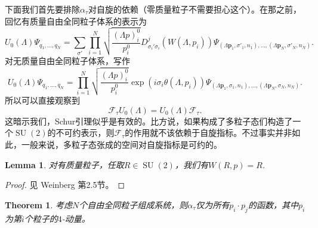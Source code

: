 \documentclass[11pt]{article}
\theoremstyle{definition}
\theoremstyle{plain}
\newtheorem{thm}[para]{Theorem}
\newtheorem{lem}[para]{Lemma}
\begin{document}
下面我们首先要排除$\alpha_\tau$对自旋的依赖（零质量粒子不需要担心这个）。在那之前，回忆有质量自由全同粒子体系的表示为
\[
	U_0(\Lambda)\Psi_{q_1,\dots,q_N}=\sum_{\sigma'}\prod_{i=1}^N \sqrt{\frac{(\Lambda p)^0_i}{p^0_i}}D^{j}_{\sigma_i'\sigma_i}(W(\Lambda,p_i))\Psi_{(\Lambda \bm{p}_1,\sigma'_1,n_1),\dots,(\Lambda \bm{p}_N,\sigma'_N,n_N)}.
\]
对无质量自由全同粒子体系，写作
\[
	U_0(\Lambda)\Psi_{q_1,\dots,q_N}=\prod_{i=1}^N \sqrt{\frac{(\Lambda p)^0_i}{p^0_i}}\exp(i\sigma_i \theta(\Lambda,p_i))\Psi_{(\Lambda \bm{p}_1,\sigma_1,n_1),\dots,(\Lambda \bm{p}_N,\sigma_N,n_N)}.
\]
所以可以直接观察到
\[
	\mathscr{F}_{\tau}U_0(\Lambda)=U_0(\Lambda)\mathscr{F}_{\tau}.
\]
这暗示我们，Schur引理似乎是有效的。比方说，如果构成了多粒子态们构造了一个$\operatorname{SU}(2)$的不可约表示，则$\mathscr{F}_{\tau}$的作用就不该依赖于自旋指标。不过事实并非如此，一般来说，多粒子态张成的空间对自旋指标是可约的。

\begin{lem}\label{lem:2.2}
对有质量粒子，任取$R\in \operatorname{SU}(2)$，我们有$W(R,p)=R$. 
\end{lem}

\begin{proof}
见 Weinberg 第2.5节。
\end{proof}

\begin{thm}
考虑$N$个自由全同粒子组成系统，则$\alpha_\tau$仅为所有$p_i\cdot p_j$的函数，其中$p_i$为第$i$个粒子的$4$-动量。
\end{thm}
\end{document}
